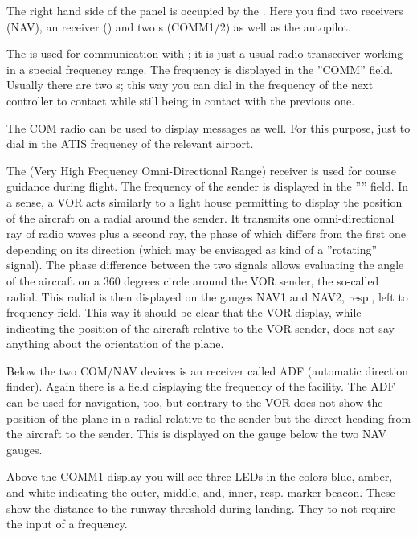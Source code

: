 The right hand side of the panel is occupied by the . Here you find
two  receivers (NAV), an  receiver
() and two s (COMM1/2) as
well as the autopilot.

The  is used for communication with ; it is just a usual radio transceiver working in a special frequency range.
The frequency is displayed in the ''COMM'' field. Usually there are two s; this way you can dial in the frequency of the next controller to contact
while still being in contact with the previous one.

The COM radio can be used to display  messages as well. For this purpose, just to dial in the ATIS frequency of the relevant airport.

The  (Very High Frequency Omni-Directional Range) receiver is used for course
guidance during flight. The frequency of the sender is displayed in the '''' field. In a sense, a VOR acts similarly to a light house permitting to display the position of the
aircraft on a radial around the sender. It transmits one omni-directional ray of radio
waves plus a second ray, the phase of which differs from the first one depending on its
direction (which may be envisaged as kind of a ''rotating'' signal). The phase difference between the two signals allows evaluating the angle of the aircraft on a 360 degrees circle
around the VOR sender, the so-called radial. This radial is then displayed on the gauges
NAV1 and NAV2, resp., left to frequency field. This way it should be clear that the VOR display, while indicating the position of the aircraft relative to the VOR sender, does not say anything about the orientation of the plane. 

Below the two COM/NAV devices is an  receiver called ADF (automatic direction
finder). Again there is a field displaying the frequency of the facility. The ADF can be
used for navigation, too, but contrary to the VOR does not show the position of the plane
in a radial relative to the sender but the direct heading from the aircraft to the
sender. This is displayed on the gauge below the two NAV gauges.

Above the COMM1 display you will see three LEDs in the colors blue, amber, and white
indicating the outer, middle, and, inner, resp. marker beacon. These show the distance to the runway
threshold during landing. They to not require the input of a frequency. 

